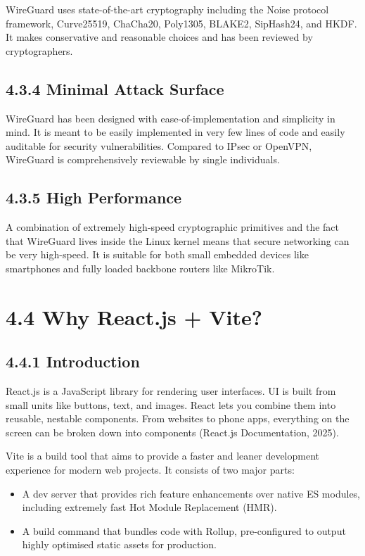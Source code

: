 \documentclass[12pt,a4paper,oneside]{report}
\begin{document}
WireGuard uses state-of-the-art cryptography including the Noise protocol framework, Curve25519, ChaCha20, Poly1305, BLAKE2, SipHash24, and HKDF. It makes conservative and reasonable choices and has been reviewed by cryptographers.

\subsection{4.3.4 Minimal Attack Surface}

WireGuard has been designed with ease-of-implementation and simplicity in mind. It is meant to be easily implemented in very few lines of code and easily auditable for security vulnerabilities. Compared to IPsec or OpenVPN, WireGuard is comprehensively reviewable by single individuals.

\subsection{4.3.5 High Performance}

A combination of extremely high-speed cryptographic primitives and the fact that WireGuard lives inside the Linux kernel means that secure networking can be very high-speed. It is suitable for both small embedded devices like smartphones and fully loaded backbone routers like MikroTik.

\section{4.4 Why React.js + Vite?}

\subsection{4.4.1 Introduction}

React.js is a JavaScript library for rendering user interfaces. UI is built from small units like buttons, text, and images. React lets you combine them into reusable, nestable components. From websites to phone apps, everything on the screen can be broken down into components (React.js Documentation, 2025).

Vite is a build tool that aims to provide a faster and leaner development experience for modern web projects. It consists of two major parts:

\begin{itemize}
  \item A dev server that provides rich feature enhancements over native ES modules, including extremely fast Hot Module Replacement (HMR).
  \item A build command that bundles code with Rollup, pre-configured to output highly optimised static assets for production.
\end{itemize}
\end{document}
